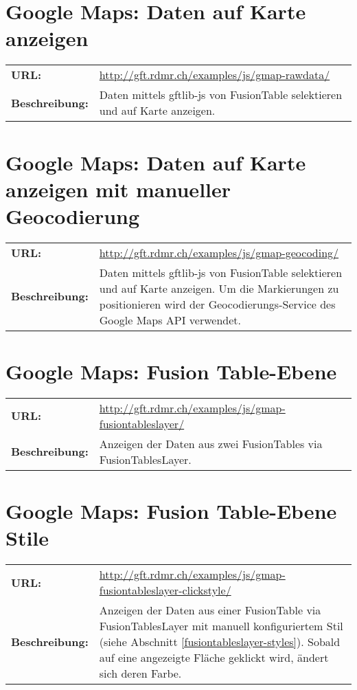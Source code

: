 \section{Google Maps: Daten auf Karte anzeigen}
\begin{tabular}{p{0.2\twocelltabwidth}p{0.8\twocelltabwidth}}
\textbf{URL:} & \url{http://gft.rdmr.ch/examples/js/gmap-rawdata/} \\ 
\textbf{Beschreibung:} & Daten mittels gftlib-js von FusionTable selektieren und auf Karte anzeigen. \\ 
\end{tabular} 

\section{Google Maps: Daten auf Karte anzeigen mit manueller Geocodierung}
\begin{tabular}{p{0.2\twocelltabwidth}p{0.8\twocelltabwidth}}
\textbf{URL:} & \url{http://gft.rdmr.ch/examples/js/gmap-geocoding/} \\ 
\textbf{Beschreibung:} & Daten mittels gftlib-js von FusionTable selektieren und auf Karte anzeigen. Um die Markierungen zu positionieren wird der Geocodierungs-Service des Google Maps API verwendet.  \\ 
\end{tabular} 

\section{Google Maps: Fusion Table-Ebene}
\begin{tabular}{p{0.2\twocelltabwidth}p{0.8\twocelltabwidth}}
\textbf{URL:} & \url{http://gft.rdmr.ch/examples/js/gmap-fusiontableslayer/} \\ 
\textbf{Beschreibung:} & Anzeigen der Daten aus zwei FusionTables via FusionTablesLayer.  \\ 
\end{tabular} 

\section{Google Maps: Fusion Table-Ebene Stile}
\begin{tabular}{p{0.2\twocelltabwidth}p{0.8\twocelltabwidth}}
\textbf{URL:} & \url{http://gft.rdmr.ch/examples/js/gmap-fusiontableslayer-clickstyle/} \\ 
\textbf{Beschreibung:} & Anzeigen der Daten aus einer FusionTable via FusionTablesLayer mit manuell konfiguriertem Stil (siehe Abschnitt \ref{fusiontableslayer-styles}). Sobald auf eine angezeigte Fläche geklickt wird, ändert sich deren Farbe. \\ 
\end{tabular} 

